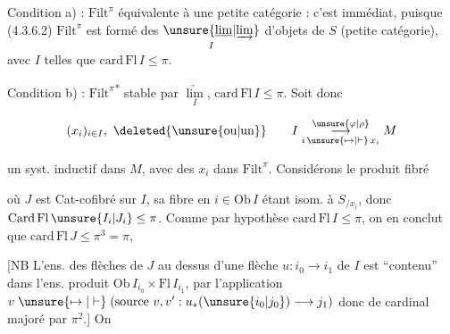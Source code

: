 
Condition a) : $\mathrm{Filt}^\pi$ équivalente à une petite catégorie : c'est immédiat, puisque  (4.3.6.2) $\mathrm{Filt}^\pi$ est formé des $\underset{I}{\unsure{\underline{\lim}|\underrightarrow{\lim}}}$  d'objets de $S$ (petite catégorie), avec $I$ telles que $\mathrm{card}\,\mathrm{Fl}\,I\leq\pi$.

Condition b) : $\mathrm{Filt}^\pi$\textsuperscript{*} stable par $\underset{I}{\underrightarrow{\lim}}$, $\mathrm{card}\,\mathrm{Fl}\,I\leq\pi$. Soit donc


\[
(x_i)_{i\in I},\ \deleted{\unsure{\text{ou}|\text{un}}}\qquad I\mathrel{\mathop{\longrightarrow}\limits^{\unsure{\varphi|\rho}}_{i\,\unsure{\mapsto|\vdash}\,x_i}}M
\]

un syst. inductif dans $M$, avec des $x_i$ dans $\mathrm{Filt}^\pi$. Considérons le produit fibré

\diagram{\[
\begin{tikzcd}[ampersand replacement=\&,column sep=large,row sep=large]
I\arrow[d,dash,"\varphi"'] \& S_{/I}=J\arrow[l,"\text{cofibré}"']\arrow[d]\arrow[dr,dashed,"\psi"] \& \\
M \& S_{/M}\arrow[l,"\text{but}"',"\text{Cat-cofibrée}"]\arrow[r,"\text{source}"] \& S\unsure{\lhook\joinrel-|\subset|\hookrightarrow}M
\end{tikzcd},
\tag*{(4.3.6.4)}
\]}

où $J$ est Cat-cofibré sur $I$, sa fibre en $i\in\mathrm{Ob}\,I$ étant isom. à $S_{/x_i}$, donc $\mathrm{Card}\,\mathrm{Fl}\,\unsure{I_i|J_i}\leq\pi$. Comme par hypothèse $\mathrm{card}\,\mathrm{Fl}\,I\leq\pi$, on en conclut que $\mathrm{card}\,\mathrm{Fl}\,J\leq\pi^3=\pi$,

[NB L'ens. des flèches  de $J$ au dessus d'une flèche $u:i_0\longrightarrow i_1$ de $I$ est ``contenu'' dans l'ens. produit $\mathrm{Ob}\,I_{i_0}\times\mathrm{Fl}\,I_{i_1}$, par l'application $v\mathrel{\unsure{\mapsto|\vdash}}(\text{source }v,v':u_*(\unsure{i_0|j_0})\longrightarrow j_1)$ donc de cardinal majoré par $\pi^2$.]  On

